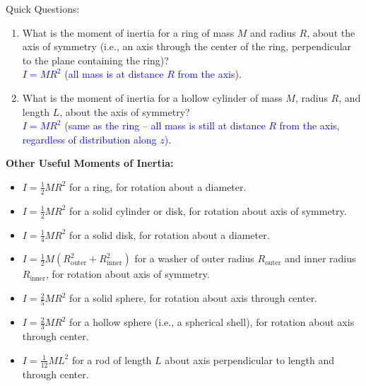 \documentclass[11pt, letterpaper, openany]{book}
\newenvironment{exercise}[1][Exercise]{%
  \tcolorbox[blanker, breakable, left=1em,
    before skip=1em, after skip=1em,
    borderline west={3pt}{0pt}{PhysNavy},
    colback=PhysCream,
    before upper={\textcolor{PhysNavy}{\sffamily\bfseries #1:}\space}
  ]%
}{%
  \endtcolorbox%
}
\begin{document}
\begin{exercise}[Exercise 3]
Quick Questions:
\begin{enumerate}[label=(\alph*)]
    \item What is the moment of inertia for a ring of mass $M$ and radius $R$, about the axis of symmetry (i.e., an axis through the center of the ring, perpendicular to the plane containing the ring)? \\
    \textcolor{blue}{$I = MR^2$ (all mass is at distance $R$ from the axis).}
    
    \item What is the moment of inertia for a hollow cylinder of mass $M$, radius $R$, and length $L$, about the axis of symmetry? \\
    \textcolor{blue}{$I = MR^2$ (same as the ring -- all mass is still at distance $R$ from the axis, regardless of distribution along $z$).}
\end{enumerate}
\end{exercise}

\textbf{Other Useful Moments of Inertia:}
\begin{itemize}
    \item $I = \tfrac{1}{2}MR^2$ for a ring, for rotation about a diameter.
    \item $I = \tfrac{1}{2}MR^2$ for a solid cylinder or disk, for rotation about axis of symmetry.
    \item $I = \tfrac{1}{4}MR^2$ for a solid disk, for rotation about a diameter.
    \item $I = \tfrac{1}{2}M(R_{\text{outer}}^2 + R_{\text{inner}}^2)$ for a washer of outer radius $R_{\text{outer}}$ and inner radius $R_{\text{inner}}$, for rotation about axis of symmetry.
    \item $I = \tfrac{2}{5}MR^2$ for a solid sphere, for rotation about axis through center.
    \item $I = \tfrac{2}{3}MR^2$ for a hollow sphere (i.e., a spherical shell), for rotation about axis through center.
    \item $I = \tfrac{1}{12}ML^2$ for a rod of length $L$ about axis perpendicular to length and through center.
\end{itemize}
\end{document}
